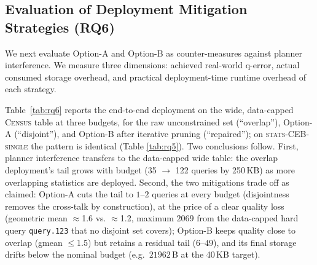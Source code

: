 \documentclass[sigconf, nonacm]{acmart}
\begin{document}
\subsection{Evaluation of Deployment Mitigation Strategies (RQ6)}
\label{sec:rq6_mitigation}
\label{sec:p1}

We next evaluate Option-A and Option-B as counter-measures against planner interference.
We measure three dimensions: achieved real-world q-error, actual consumed storage overhead, and practical deployment-time runtime overhead of each strategy.

Table~\ref{tab:rq6} reports the end-to-end deployment on the wide, data-capped
\textsc{Census} table at three budgets, for the raw unconstrained set
(``overlap''), Option-A (``disjoint''), and Option-B after iterative pruning
(``repaired''); on \textsc{stats-CEB-single} the pattern is identical (Table
\ref{tab:rq5}). Two conclusions follow. First, planner interference transfers
to the data-capped wide table: the overlap deployment's tail grows with budget
(35 $\to$ 122 queries by 250\,KB) as more overlapping statistics are
deployed. Second, the two mitigations trade off as claimed: Option-A cuts the
tail to $1$--$2$ queries at every budget (disjointness removes the cross-talk
by construction), at the price of a clear quality loss (geometric mean
$\approx$1.6 vs. $\approx$1.2, maximum $2069$ from the data-capped hard query
\texttt{query.123} that no disjoint set covers); Option-B keeps quality close to
overlap (gmean $\le$1.5) but retains a residual tail ($6$--$49$), and its final
storage drifts below the nominal budget (e.g.\ $21962$\,B at the 40\,KB
target).
\end{document}
